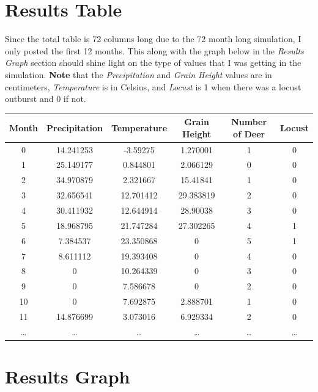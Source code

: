 \documentclass[onecolumn,draftclsnofoot, 10pt, compsoc]{IEEEtran}
\begin{document}
	
	
	
	
	\section{Results Table}
	Since the total table is 72 columns long  due to the 72 month long simulation, I only posted the first 12 months.
	This along with the graph below in the \textit{Results Graph} section should shine light on the type of values that I was getting in the simulation.
	\textbf{Note} that the \textit{Precipitation} and \textit{Grain Height} values are in centimeters, \textit{Temperature} is in Celsius, and \textit{Locust} is 1 when there was a locust outburst and 0 if not.
	
		\begin{center}
			\begin{tabular}{|c|c|c|c|c|c|}
				\hline
				
				\textbf{Month} & \textbf{Precipitation} & \textbf{Temperature} & \textbf{Grain Height} & \textbf{Number of Deer} & \textbf{Locust} \\ \hline
			0 & 14.241253 & -3.59275 &1.270001&1&0 \\ \hline
			1 & 25.149177	& 0.844801&2.066129&0	&0\\ \hline
			2 &34.970879	&2.321667&15.41841&1&0\\ \hline
			3 & 32.656541	&12.701412&29.383819	&2&0\\ \hline
			4 & 30.411932	&12.644914&28.90038&3&0\\ \hline
			5 & 18.968795	&21.747284&27.302265&4&1\\ \hline
			6 & 7.384537	&23.350868&0&5&1\\ \hline
			7 & 8.611112	&19.393408&0&4&0\\ \hline
			8 & 0	&10.264339&0	&3&0\\ \hline
			9 & 0&7.586678&0&2&0\\ \hline
			10 & 0 	&7.692875&2.888701&1&0\\ \hline
			11 & 14.876699 &3.073016&6.929334&2&0\\ \hline
			\dots & \dots & \dots & \dots & \dots & \dots  \\ \hline
			\end{tabular}
		\end{center}
	
	
	
	
	
	
	\section{Results Graph}
\end{document}
